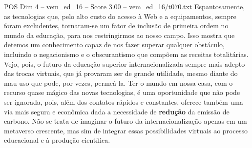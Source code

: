 \begin{textsample}{POS Dim 4 – vem\_ed\_16 – Score 3.00 – vem\_ed\_16/t070.txt}
Espantosamente, as tecnologias que, pelo alto custo do acesso à Web e a equipamentos, sempre foram excludentes, tornaram-se um fator de inclusão de primeira ordem no mundo da educação, para nos restringirmos ao nosso campo.
Isso mostra que detemos um conhecimento capaz de nos fazer superar qualquer obstáculo, incluindo o negacionismo e o obscurantismo que compõem as receitas totalitárias.
Vejo, pois, o futuro da educação superior internacionalizada sempre mais adepto das trocas virtuais, que já provaram ser de grande utilidade, mesmo diante do mau uso que pode, por vezes, permeá-la.
Ter o mundo em nossa casa, com o recurso quase mágico das novas tecnologias, é uma oportunidade que não pode ser ignorada, pois, além dos contatos rápidos e constantes, oferece também uma via mais segura e econômica dada a necessidade de \textbf{redução} da emissão de carbono.
Não se trata de imaginar o futuro da internacionalização apenas em um metaverso crescente, mas sim de integrar essas possibilidades virtuais ao processo educacional e à produção científica.

\end{textsample}
